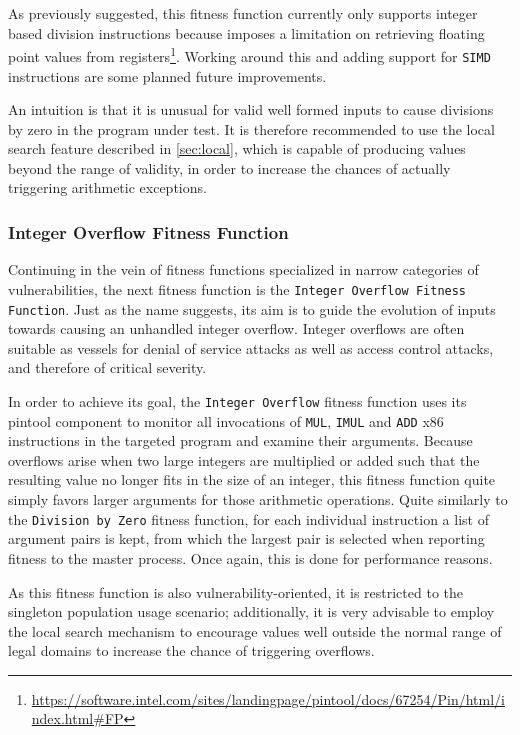 As previously suggested, this fitness function currently only supports integer based division instructions
because \pin imposes a limitation on retrieving floating point values from
registers\footnote{\url{https://software.intel.com/sites/landingpage/pintool/docs/67254/Pin/html/index.html\#FP}}.
Working around this and adding support for \texttt{SIMD} instructions are some planned future improvements.

An intuition is that it is unusual for valid well formed inputs to cause divisions by zero in the program under
test. It is therefore recommended to use the local search feature described in \cref{sec:local}, which is
capable of producing values beyond the range of validity, in order to increase the chances of actually
triggering arithmetic exceptions.

\subsubsection{Integer Overflow Fitness Function}
Continuing in the vein of fitness functions specialized in narrow categories of vulnerabilities, the next
fitness function is the \texttt{Integer Overflow Fitness Function}. Just as the name suggests, its aim is to
guide the evolution of inputs towards causing an unhandled integer overflow. Integer overflows are often
suitable as vessels for denial of service attacks as well as access control attacks, and therefore of
critical severity. 

In order to achieve its goal, the \texttt{Integer Overflow} fitness function uses its pintool component to
monitor all invocations of \texttt{MUL}, \texttt{IMUL} and \texttt{ADD} x86 instructions in the targeted
program and examine their arguments. Because overflows arise when two large integers are multiplied or added
such that the resulting value no longer fits in the size of an integer, this fitness function quite simply
favors larger arguments for those arithmetic operations. Quite similarly to the \texttt{Division by Zero}
fitness function, for each individual instruction a list of argument pairs is kept, from which the largest pair
is selected when reporting fitness to the \java master process. Once again, this is done for performance
reasons.
 
As this fitness function is also vulnerability-oriented, it is restricted to the singleton population usage
scenario; additionally, it is very advisable to employ the local search mechanism to encourage values
well outside the normal range of legal domains to increase the chance of triggering overflows.

